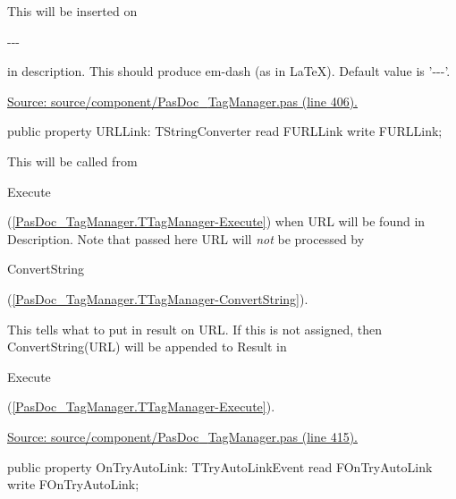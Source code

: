 \documentclass{report}
\newif\ifpdf
\begin{document}
\begin{list}{}
\begin{flushleft}
\ifpdf
\end{flushleft}
\fi


\par This will be inserted on \begin{ttfamily}{-}{-}{-}\end{ttfamily} in description. This should produce em{-}dash (as in LaTeX). Default value is '{-}{-}{-}'.\par
\href{https://github.com/pasdoc/pasdoc/blob/master/source/component/PasDoc_TagManager.pas#L406}{Source: source/component/PasDoc{\_}TagManager.pas (line 406).}\label{PasDoc_TagManager.TTagManager-URLLink}
\item[\textbf{URLLink}\hfill]
\ifpdf
\begin{flushleft}
\fi
\begin{ttfamily}
public property URLLink: TStringConverter read FURLLink write FURLLink;\end{ttfamily}

\ifpdf
\end{flushleft}
\fi


\par This will be called from \begin{ttfamily}Execute\end{ttfamily}(\ref{PasDoc_TagManager.TTagManager-Execute}) when URL will be found in Description. Note that passed here URL will \textit{not} be processed by \begin{ttfamily}ConvertString\end{ttfamily}(\ref{PasDoc_TagManager.TTagManager-ConvertString}).

This tells what to put in result on URL. If this is not assigned, then ConvertString(URL) will be appended to Result in \begin{ttfamily}Execute\end{ttfamily}(\ref{PasDoc_TagManager.TTagManager-Execute}).\par
\href{https://github.com/pasdoc/pasdoc/blob/master/source/component/PasDoc_TagManager.pas#L415}{Source: source/component/PasDoc{\_}TagManager.pas (line 415).}\label{PasDoc_TagManager.TTagManager-OnTryAutoLink}
\item[\textbf{OnTryAutoLink}\hfill]
\ifpdf
\begin{flushleft}
\fi
\begin{ttfamily}
public property OnTryAutoLink: TTryAutoLinkEvent
      read FOnTryAutoLink write FOnTryAutoLink;\end{ttfamily}


\end{flushleft}
\end{list}
\end{document}
